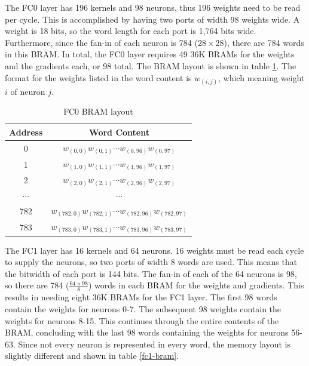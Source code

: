 The FC0 layer has 196 kernels and 98 neurons, thus 196 weights need to be read per cycle.  This is accomplished by having two ports of width 98 weights wide. A weight is 18 bits, so the word length for each port is 1,764 bits wide. Furthermore, since the fan-in of each neuron is 784 ($28 \times 28$), there are 784 words in this BRAM. In total, the FC0 layer requires 49 36K BRAMs for the weights and the gradients each, or 98 total. The BRAM layout is shown in table \ref{fc0-bram}. The format for the weights listed in the word content is $w_{(i, j)}$, which meaning weight $i$ of neuron $j$.
\begin{table}
	\centering
	\begin{tabular}{|c|c|}
		\hline
		\textbf{Address} & \textbf{Word Content} \\\hline
		0 & $w_{(0, 0)}w_{(0, 1)}\cdots w_{(0, 96)}w_{(0, 97)}$\\
		1 & $w_{(1, 0)}w_{(1, 1)}\cdots w_{(1, 96)}w_{(1, 97)}$\\
		2 & $w_{(2, 0)}w_{(2, 1)}\cdots w_{(2, 96)}w_{(2, 97)}$\\
		$\cdots$ & $\cdots$ \\
		782 & $w_{(782, 0)}w_{(782, 1)}\cdots w_{(782, 96)}w_{(782, 97)}$\\
		783 & $w_{(783, 0)}w_{(783, 1)}\cdots w_{(783, 96)}w_{(783, 97)}$\\\hline
	\end{tabular}
	\caption{FC0 BRAM layout}	
	\label{fc0-bram}
\end{table}

The FC1 layer has 16 kernels and 64 neurons. 16 weights must be read each cycle to supply the neurons, so two ports of width 8 words are used. This means that the bitwidth of each port is 144 bits. The fan-in of each of the 64 neurons is 98, so there are 784 ($\frac{64\times98}{8}$) words in each BRAM for the weights and gradients. This results in needing eight 36K BRAMs for the FC1 layer. The first 98 words contain the weights for neurons 0-7. The subsequent 98 weights contain the weights for neurons 8-15. This continues through the entire contents of the BRAM, concluding with the last 98 words containing the weights for neurons 56-63. Since not every neuron is represented in every word, the memory layout is slightly different and shown in table \ref{fc1-bram}.

